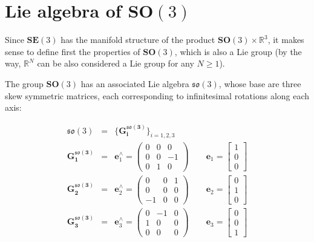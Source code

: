 \documentclass[a4paper,11pt]{report}
\newcommand{\hatop}[1]{#1^\wedge}
\begin{document}
\section{Lie algebra of $\mathbf{SO}(3)$}

Since $\mathbf{SE}(3)$ has the manifold structure of the product
$\mathbf{SO}(3) \times \mathbb{R}^3$, it makes sense to define first
the properties of $\mathbf{SO}(3)$, which is also a Lie group
(by the way, $\mathbb{R}^N$ can be also considered a Lie group for any $N \geq 1$).


The group $\mathbf{SO}(3)$ has an associated Lie algebra $\mathfrak{so}(3)$,
whose base are three skew symmetric matrices, each corresponding to
infinitesimal rotations along each axis:

\begin{eqnarray}
\mathfrak{so}(3) &=& \{  \mathbf{G^{\mathfrak{so}(3)}_i} \}_{i=1,2,3}  \\
\mathbf{G^{\mathfrak{so}(3)}_1} &=& \hatop{\mathbf{e}}_1
=
\left(
\begin{array}{ccc}
0 & 0 & 0  \\
0 & 0 & -1  \\
0 & 1 & 0
\end{array}
\right) 
\quad\quad
\mathbf{e}_1 = \left[ \begin{array}{c} 1 \\ 0 \\0 \end{array} \right]
\\
\mathbf{G^{\mathfrak{so}(3)}_2} &=& \hatop{\mathbf{e}}_2
=
\left(
\begin{array}{ccc}
0 & 0 & 1  \\
0 & 0 & 0  \\
-1 & 0 & 0
\end{array}
\right)
\quad\quad
\mathbf{e}_2 = \left[ \begin{array}{c} 0 \\ 1 \\0 \end{array} \right]
\\
\mathbf{G^{\mathfrak{so}(3)}_3} &=& \hatop{\mathbf{e}}_3
=
\left(
\begin{array}{ccc}
0 & -1 & 0  \\
1 & 0 & 0  \\
0 & 0 & 0
\end{array}
\right)
\quad\quad
\mathbf{e}_3 = \left[ \begin{array}{c} 0 \\ 0 \\1 \end{array} \right]
\\
\end{eqnarray}
\end{document}
